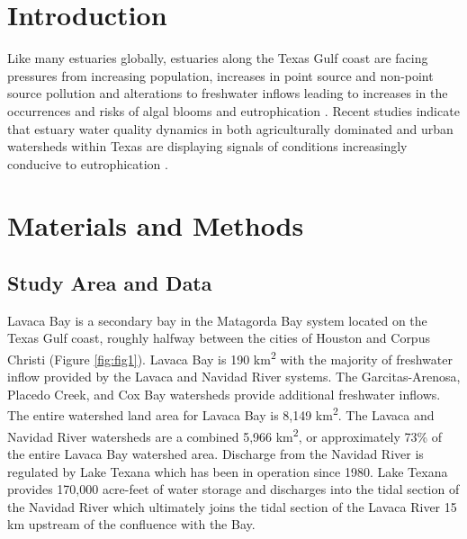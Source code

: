 \documentclass[water,article,submit,oneauthor]{Definitions/mdpi}
\begin{document}

\hypertarget{introduction}{%
\section{Introduction}\label{introduction}}

Like many estuaries globally, estuaries along the Texas Gulf coast are
facing pressures from increasing population, increases in point source
and non-point source pollution and alterations to freshwater inflows
leading to increases in the occurrences and risks of algal blooms and
eutrophication
\citep{bricker_effects_2008, kennicuttWaterQualityGulf2017, bugica_water_2020}.
Recent studies indicate that estuary water quality dynamics in both
agriculturally dominated and urban watersheds within Texas are
displaying signals of conditions increasingly conducive to
eutrophication
\citep{wetzWaterQualityDynamics2016, wetz_exceptionally_2017, bugica_water_2020, chinPhytoplanktonBiomassCommunity2022}.

\hypertarget{materials-and-methods}{%
\section{Materials and Methods}\label{materials-and-methods}}

\hypertarget{study-area-and-data}{%
\subsection{Study Area and Data}\label{study-area-and-data}}

Lavaca Bay is a secondary bay in the Matagorda Bay system located on the
Texas Gulf coast, roughly halfway between the cities of Houston and
Corpus Christi (Figure \ref{fig:fig1}). Lavaca Bay is 190
km\textsuperscript{2} with the majority of freshwater inflow provided by
the Lavaca and Navidad River systems. The Garcitas-Arenosa, Placedo
Creek, and Cox Bay watersheds provide additional freshwater inflows. The
entire watershed land area for Lavaca Bay is 8,149
km\textsuperscript{2}. The Lavaca and Navidad River watersheds are a
combined 5,966 km\textsuperscript{2}, or approximately 73\% of the
entire Lavaca Bay watershed area. Discharge from the Navidad River is
regulated by Lake Texana which has been in operation since 1980. Lake
Texana provides 170,000 acre-feet of water storage and discharges into
the tidal section of the Navidad River which ultimately joins the tidal
section of the Lavaca River 15 km upstream of the confluence with the
Bay.
\end{document}
